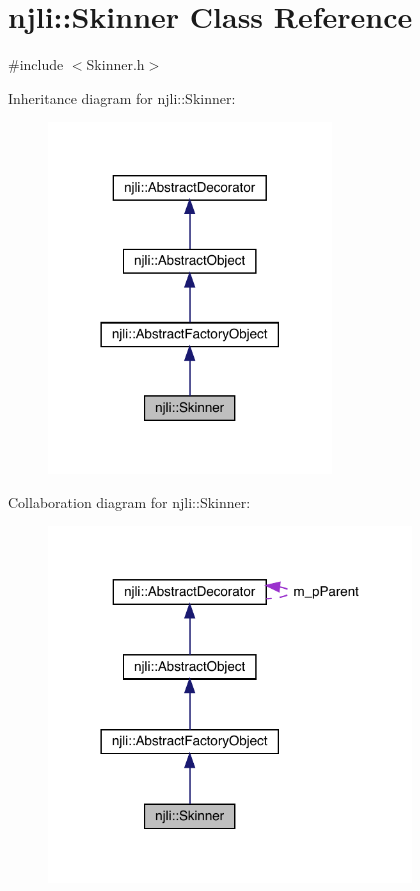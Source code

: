 \hypertarget{classnjli_1_1_skinner}{}\section{njli\+:\+:Skinner Class Reference}
\label{classnjli_1_1_skinner}


{\ttfamily \#include $<$Skinner.\+h$>$}



Inheritance diagram for njli\+:\+:Skinner\+:\nopagebreak
\begin{figure}[H]
\begin{center}
\leavevmode
\includegraphics[width=213pt]{classnjli_1_1_skinner__inherit__graph}
\end{center}
\end{figure}


Collaboration diagram for njli\+:\+:Skinner\+:\nopagebreak
\begin{figure}[H]
\begin{center}
\leavevmode
\includegraphics[width=273pt]{classnjli_1_1_skinner__coll__graph}
\end{center}
\end{figure}
